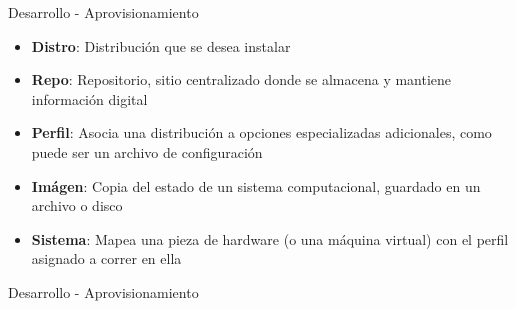 \begin{frame}{Desarrollo - Aprovisionamiento}
    \vspace{-1.5cm}
    \begin{itemize}
        \item \textbf{Distro}: Distribución que se desea instalar
        \item \textbf{Repo}: Repositorio, sitio centralizado donde se almacena y mantiene información digital
        \item \textbf{Perfil}: Asocia una distribución a opciones especializadas adicionales, como puede ser un archivo de configuración
        \item \textbf{Imágen}: Copia del estado de un sistema computacional, guardado en un archivo o disco
        \item \textbf{Sistema}: Mapea una pieza de hardware (o una máquina virtual) con el perfil asignado a correr en ella
    \end{itemize}

\end{frame}

\begin{frame}{Desarrollo - Aprovisionamiento}
    \vspace{0.5cm}
    \begin{figure}[ht]
       \centering
       \vspace{-0.50cm}
    \end{figure}
\end{frame}


%

